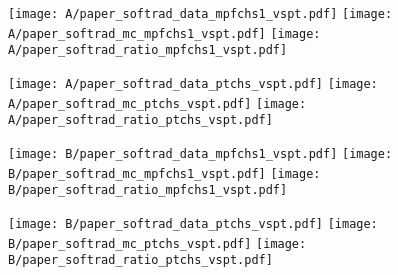\documentclass[landscape,10pt]{beamer} %
\newcommand{\commentout}[1]{}
\begin{document}
\begin{figure}[p]
\centering
  \texttt{[image: A/paper\_softrad\_data\_mpfchs1\_vspt.pdf]}
  \texttt{[image: A/paper\_softrad\_mc\_mpfchs1\_vspt.pdf]}
  \texttt{[image: A/paper\_softrad\_ratio\_mpfchs1\_vspt.pdf]}
\end{figure}

\begin{figure}[p]
\centering
  \texttt{[image: A/paper\_softrad\_data\_ptchs\_vspt.pdf]}
  \texttt{[image: A/paper\_softrad\_mc\_ptchs\_vspt.pdf]}
  \texttt{[image: A/paper\_softrad\_ratio\_ptchs\_vspt.pdf]}
\end{figure}

\newpage

\begin{figure}[p]
\centering
  \texttt{[image: B/paper\_softrad\_data\_mpfchs1\_vspt.pdf]}
  \texttt{[image: B/paper\_softrad\_mc\_mpfchs1\_vspt.pdf]}
  \texttt{[image: B/paper\_softrad\_ratio\_mpfchs1\_vspt.pdf]}
\end{figure}

\begin{figure}[p]
\centering
  \texttt{[image: B/paper\_softrad\_data\_ptchs\_vspt.pdf]}
  \texttt{[image: B/paper\_softrad\_mc\_ptchs\_vspt.pdf]}
  \texttt{[image: B/paper\_softrad\_ratio\_ptchs\_vspt.pdf]}
\end{figure}


\newpage
\commentout{
\begin{figure}[p]
\centering
  \texttt{[image: L4/paper\_softrad\_data\_mpfchs1\_vspt.pdf]}
  \texttt{[image: L4/paper\_softrad\_mc\_mpfchs1\_vspt.pdf]}
  \texttt{[image: L4/paper\_softrad\_ratio\_mpfchs1\_vspt.pdf]}
\end{figure}

\begin{figure}[p]
\centering
  \texttt{[image: L4/paper\_softrad\_data\_ptchs\_vspt.pdf]}
  \texttt{[image: L4/paper\_softrad\_mc\_ptchs\_vspt.pdf]}
  \texttt{[image: L4/paper\_softrad\_ratio\_ptchs\_vspt.pdf]}
\end{figure}
} %
\end{document}
